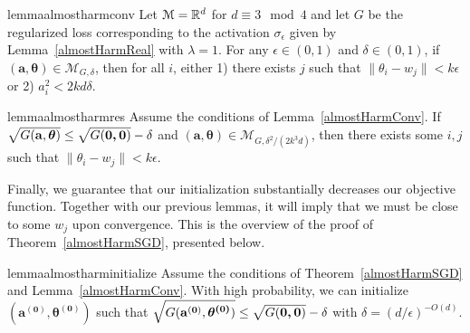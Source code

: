 %
\begin{restatable}{lemma}{almostharmconv}\label{almostHarmConv}
  Let $\mathcal{M} = {\mathbb{R}}^d$ for $d \equiv 3 \mod 4$ and let $G$ be the
  regularized loss corresponding to the activation 
  $\sigma_\epsilon$ given by Lemma~\ref{almostHarmReal} with
  $\lambda =1$. For any $\epsilon \in (0,1)$ and $\delta \in (0, 1)$,
  if $\boldsymbol{(a,\theta)} \in \mathcal{M}_{G,\delta}$, then for
  all $i$, either 1) there exists $j$ such that
  $\|\theta_i - w_j\| < k\epsilon$ or 2) $a_i^2 < 2kd\delta$.
\end{restatable}
%
\begin{restatable}{lemma}{almostharmres}\label{almostHarmRes}
  Assume the conditions of Lemma~\ref{almostHarmConv}. If
$\sqrt{G({\bf a, \boldsymbol{\theta}})} \leq \sqrt{G(\boldsymbol{0,0})} - \delta$
  and $(\boldsymbol{a,\theta}) \in \mathcal{M}_{G,\delta^2/(2k^3d)}$,
  then there exists some $i, j$ such that $\|\theta_i - w_j\| <k\epsilon$.
\end{restatable}
 Finally, we guarantee that our initialization substantially decreases our objective function. Together with our previous lemmas, it will imply that we must be close to some $w_j$ upon convergence. This is the overview of the proof of Theorem~\ref{almostHarmSGD}, presented below.
 \begin{restatable}{lemma}{almostharminitialize}\label{almostHarmInitialize}
Assume the conditions of Theorem~\ref{almostHarmSGD} and Lemma~\ref{almostHarmConv}. With high probability, we can initialize $\boldsymbol{(a^{(0)},\theta^{(0)})}$ such that $\sqrt{G({\bf a^{(0)}}, \boldsymbol{\theta^{(0)}})} \leq \sqrt{G(\boldsymbol{0,0})} -\delta$ with $\delta = (d/\epsilon)^{ - O(d)}$.
 \end{restatable}
